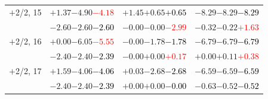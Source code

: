 \documentclass[compress]{beamer}
\begin{document}
\begin{frame}
\begin{tabular}{r | c | c | c}
$+$2/2, 15 & $+1.37$\hspace{0.1 cm}$-4.90$\hspace{0.1 cm}\textcolor{red}{$-4.18$} & $+1.45$\hspace{0.1 cm}$+0.65$\hspace{0.1 cm}\textcolor{black}{$+0.65$} & $-8.29$\hspace{0.1 cm}$-8.29$\hspace{0.1 cm}\textcolor{black}{$-8.29$} \\
           & $-2.60$\hspace{0.1 cm}$-2.60$\hspace{0.1 cm}\textcolor{black}{$-2.60$} & $-0.00$\hspace{0.1 cm}$-0.00$\hspace{0.1 cm}\textcolor{red}{$-2.99$} & $-0.32$\hspace{0.1 cm}$-0.22$\hspace{0.1 cm}\textcolor{red}{$+1.63$} \\
$+$2/2, 16 & $+0.00$\hspace{0.1 cm}$-6.05$\hspace{0.1 cm}\textcolor{red}{$-5.55$} & $-0.00$\hspace{0.1 cm}$-1.78$\hspace{0.1 cm}\textcolor{black}{$-1.78$} & $-6.79$\hspace{0.1 cm}$-6.79$\hspace{0.1 cm}\textcolor{black}{$-6.79$} \\
           & $-2.40$\hspace{0.1 cm}$-2.40$\hspace{0.1 cm}\textcolor{black}{$-2.39$} & $-0.00$\hspace{0.1 cm}$+0.00$\hspace{0.1 cm}\textcolor{red}{$+0.17$} & $+0.00$\hspace{0.1 cm}$+0.11$\hspace{0.1 cm}\textcolor{red}{$+0.38$} \\
$+$2/2, 17 & $+1.59$\hspace{0.1 cm}$-4.06$\hspace{0.1 cm}\textcolor{black}{$-4.06$} & $+0.03$\hspace{0.1 cm}$-2.68$\hspace{0.1 cm}\textcolor{black}{$-2.68$} & $-6.59$\hspace{0.1 cm}$-6.59$\hspace{0.1 cm}\textcolor{black}{$-6.59$} \\
           & $-2.40$\hspace{0.1 cm}$-2.40$\hspace{0.1 cm}\textcolor{black}{$-2.39$} & $+0.00$\hspace{0.1 cm}$+0.00$\hspace{0.1 cm}\textcolor{black}{$-0.00$} & $-0.63$\hspace{0.1 cm}$-0.52$\hspace{0.1 cm}\textcolor{black}{$-0.52$} \\

\end{tabular}
\end{frame}
\end{document}
